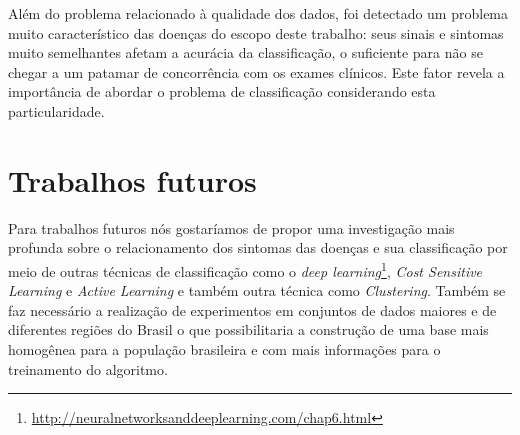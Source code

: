 Além do problema relacionado à qualidade dos dados, foi detectado um problema muito característico das doenças do escopo deste trabalho: seus sinais e sintomas muito semelhantes afetam a acurácia da classificação, o suficiente para não se chegar a um patamar de concorrência com os exames clínicos. Este fator revela a importância de abordar o problema de classificação considerando esta particularidade.

\section{Trabalhos futuros}

Para trabalhos futuros nós gostaríamos de propor uma investigação mais profunda sobre o relacionamento dos sintomas das doenças e sua classificação por meio de outras técnicas de classificação como o \textit{deep learning}\footnote{\url{http://neuralnetworksanddeeplearning.com/chap6.html}}, \textit{Cost Sensitive Learning} e \textit{Active Learning} \cite{krishnamurthy2017active} e também outra técnica como \textit{Clustering}. Também se faz necessário a realização de experimentos em conjuntos de dados maiores e de diferentes regiões do Brasil o que possibilitaria a construção de uma base mais homogênea para a população brasileira e com mais informações para o treinamento do algoritmo.